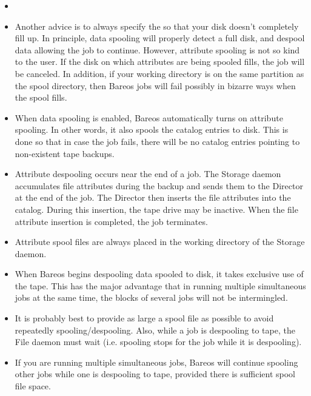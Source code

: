\begin{itemize}

\item {}

\item Another advice is to always specify the 
so that your disk
doesn't completely fill up. In principle, data spooling will properly detect a
full disk, and despool data allowing the job to continue. However, attribute
spooling is not so kind to the user. If the disk on which attributes are being
spooled fills, the job will be canceled. In addition, if your working
directory is on the same partition as the spool directory, then Bareos jobs
will fail possibly in bizarre ways when the spool fills.

\item When data spooling is enabled, Bareos automatically  turns on attribute
   spooling. In other words, it also  spools the catalog entries to disk. This is
   done so  that in case the job fails, there will be no catalog  entries
   pointing to non-existent tape backups.
\item Attribute despooling occurs near the end of a job.  The Storage daemon
   accumulates file attributes during the backup and  sends them to the
   Director at the end of the job.  The Director then inserts the file
   attributes into the catalog.  During this insertion, the tape drive may
   be inactive.  When the file attribute insertion is completed, the job
   terminates.
\item Attribute spool files are always placed in the  working directory of
   the Storage daemon.
\item When Bareos begins despooling data spooled to disk, it  takes exclusive
   use of the tape. This has the major  advantage that in running multiple
   simultaneous jobs at  the same time, the blocks of several jobs will not be
   intermingled.
\item It is probably best to provide as large a spool file as  possible to
   avoid repeatedly spooling/despooling. Also,  while a job is despooling to
   tape, the File daemon must wait  (i.e. spooling stops for the job while it is
   despooling).
\item If you are running multiple simultaneous jobs, Bareos  will continue
   spooling other jobs while one is despooling  to tape, provided there is
   sufficient spool file space.
\end{itemize}
